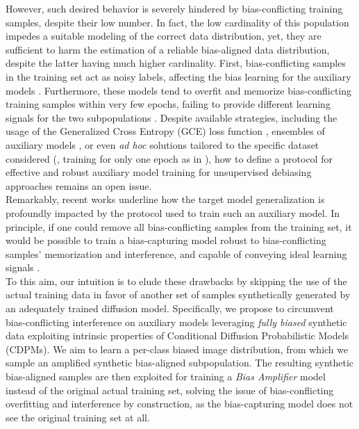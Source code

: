 However, such desired behavior is severely hindered by bias-conflicting training samples, despite their low number. In fact, the low cardinality of this population impedes a suitable modeling of the correct data distribution, yet, they are sufficient to harm the estimation of a reliable bias-aligned data distribution, despite the latter having much higher cardinality. First, bias-conflicting samples in the training set act as noisy labels, affecting the bias learning for the auxiliary models \cite{Lee_Park_Kim_Lee_Choi_Choo_2023}. Furthermore, these models tend to overfit and memorize bias-conflicting training samples within very few epochs, failing to provide different learning signals for the two subpopulations \cite{zarlenga2024efficient}. 
Despite available strategies, including the usage of the Generalized Cross Entropy (GCE) loss function \cite{nam2020learning,pastore2024lookingmodeldebiasinglens},  %
ensembles of auxiliary models \cite{NEURIPS2022_75004615_LWBC, Lee_Park_Kim_Lee_Choi_Choo_2023}, or even \textit{ad hoc} solutions tailored to the specific dataset considered (\eg, training for only one epoch as in \cite{pmlr-v139-liu21f_JTT}), how to define a protocol for effective and robust auxiliary model training for unsupervised debiasing approaches remains an open issue. 
\\
Remarkably, recent works \cite{pastore2024lookingmodeldebiasinglens, Lee_Park_Kim_Lee_Choi_Choo_2023, NEURIPS2022_75004615_LWBC} underline how the target model generalization is profoundly impacted by the protocol used to train such an auxiliary model. 
In principle, if one could remove all bias-conflicting samples from the training set, it would be possible to train a bias-capturing model robust to bias-conflicting samples' memorization and interference, and capable of conveying ideal learning signals \cite{Lee_Park_Kim_Lee_Choi_Choo_2023}. 
\\ To this aim, our intuition is to elude these drawbacks by skipping the use of the actual training data in favor of another set of samples synthetically generated by an adequately trained diffusion model. Specifically, we propose to circumvent bias-conflicting interference on auxiliary models leveraging \textit{fully biased} synthetic data exploiting intrinsic properties of Conditional Diffusion Probabilistic Models (CDPMs). We aim to learn a per-class biased image distribution, from which we sample an amplified synthetic bias-aligned subpopulation. The resulting synthetic bias-aligned samples are then exploited for training a \textit{Bias Amplifier} model instead of the original actual training set, solving the issue of bias-conflicting overfitting and interference by construction, as the bias-capturing model does not see the original training set at all. 
